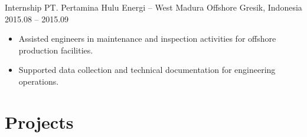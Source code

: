 \begin{sectionbody}
\cventry
    {Internship}
    {PT. Pertamina Hulu Energi -- West Madura Offshore}
    {Gresik, Indonesia}
    {2015.08 -- 2015.09}
    {
        \begin{itemize}[itemsep=1pt, topsep=2pt]
            \item Assisted engineers in maintenance and inspection activities for offshore production facilities.
            \item Supported data collection and technical documentation for engineering operations.
        \end{itemize}
    }

\end{sectionbody}

\section{Projects}

